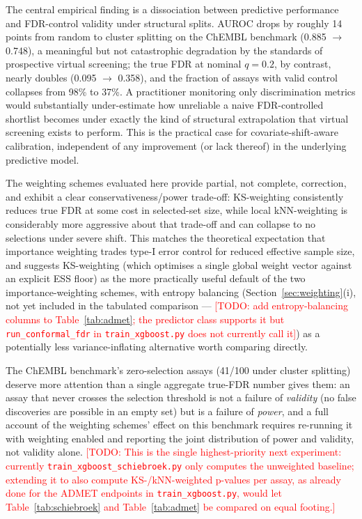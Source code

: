 \documentclass[11pt]{article}
\newcommand{\TODO}[1]{\textcolor{red}{[TODO: #1]}}
\begin{document}
The central empirical finding is a dissociation between predictive
performance and FDR-control validity under structural splits. AUROC drops by
roughly 14 points from random to cluster splitting on the ChEMBL benchmark
(0.885 $\to$ 0.748), a meaningful but not catastrophic degradation by the
standards of prospective virtual screening; the true FDR at nominal $q=0.2$,
by contrast, nearly doubles (0.095 $\to$ 0.358), and the fraction of assays
with valid control collapses from 98\% to 37\%. A practitioner monitoring
only discrimination metrics would substantially under-estimate how
unreliable a naive FDR-controlled shortlist becomes under exactly the kind of
structural extrapolation that virtual screening exists to perform. This is
the practical case for covariate-shift-aware calibration, independent of any
improvement (or lack thereof) in the underlying predictive model.

The weighting schemes evaluated here provide partial, not complete,
correction, and exhibit a clear conservativeness/power trade-off: KS-weighting
consistently reduces true FDR at some cost in selected-set size, while local
kNN-weighting is considerably more aggressive about that trade-off and can
collapse to no selections under severe shift. This matches the theoretical
expectation that importance weighting trades type-I error control for reduced
effective sample size, and suggests KS-weighting (which optimises a single
global weight vector against an explicit ESS floor) as the more practically
useful default of the two importance-weighting schemes, with entropy
balancing (Section~\ref{sec:weighting}(i), not yet included in the tabulated
comparison --- \TODO{add entropy-balancing columns to Table~\ref{tab:admet};
the predictor class supports it but \texttt{run\_conformal\_fdr} in
\texttt{train\_xgboost.py} does not currently call it}) as a potentially
less variance-inflating alternative worth comparing directly.

The ChEMBL benchmark's zero-selection assays (41/100 under cluster
splitting) deserve more attention than a single aggregate true-FDR number
gives them: an assay that never crosses the selection threshold is not a
failure of \emph{validity} (no false discoveries are possible in an empty
set) but is a failure of \emph{power}, and a full account of the
weighting schemes' effect on this benchmark requires re-running it with
weighting enabled and reporting the joint distribution of power and
validity, not validity alone. \TODO{This is the single highest-priority
next experiment: currently \texttt{train\_xgboost\_schiebroek.py} only
computes the unweighted baseline; extending it to also compute
KS-/kNN-weighted p-values per assay, as already done for the ADMET
endpoints in \texttt{train\_xgboost.py}, would let
Table~\ref{tab:schiebroek} and Table~\ref{tab:admet} be compared on equal
footing.}
\end{document}
